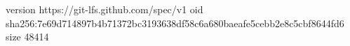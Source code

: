 version https://git-lfs.github.com/spec/v1
oid sha256:7e69d714897b4b71372bc3193638df58c6a680baeafe5cebb2e8c5cbf8644fd6
size 48414

